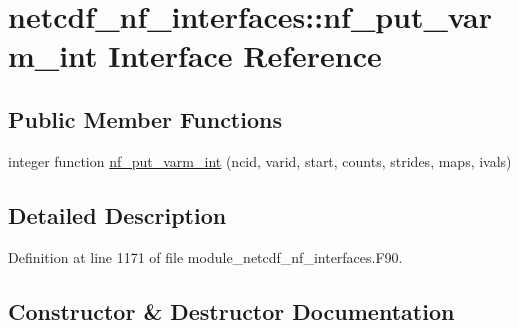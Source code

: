 \hypertarget{interfacenetcdf__nf__interfaces_1_1nf__put__varm__int}{}\section{netcdf\+\_\+nf\+\_\+interfaces\+:\+:nf\+\_\+put\+\_\+varm\+\_\+int Interface Reference}
\label{interfacenetcdf__nf__interfaces_1_1nf__put__varm__int}
\subsection*{Public Member Functions}
\begin{DoxyCompactItemize}
\item 
integer function \hyperlink{interfacenetcdf__nf__interfaces_1_1nf__put__varm__int_a12635ad36f044b6d72377f8c8094cbd3}{nf\+\_\+put\+\_\+varm\+\_\+int} (ncid, varid, start, counts, strides, maps, ivals)
\end{DoxyCompactItemize}


\subsection{Detailed Description}


Definition at line 1171 of file module\+\_\+netcdf\+\_\+nf\+\_\+interfaces.\+F90.



\subsection{Constructor \& Destructor Documentation}
\mbox{\label{interfacenetcdf__nf__interfaces_1_1nf__put__varm__int_a12635ad36f044b6d72377f8c8094cbd3}} 
